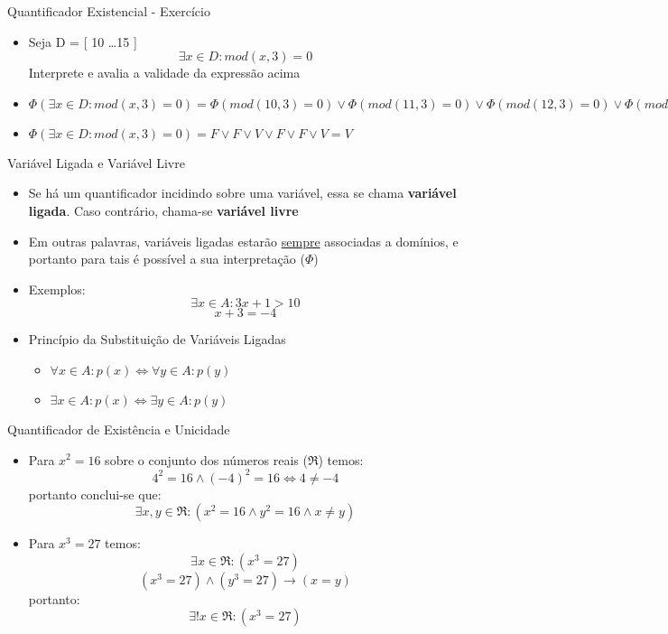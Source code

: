 \begin{frame}[t]{Quantificador Existencial - Exercício}
	\begin{itemize}\itemsep 0.7cm
	\item Seja D = [ 10 \ldots 15 ] $$\exists x \in D: mod(x,3) = 0$$ Interprete e avalia a validade da expressão acima

	\item {\scriptsize $\Phi(\exists x \in D: mod(x,3) = 0) = \Phi(mod(10,3) = 0) \vee \Phi(mod(11,3) = 0) \vee \Phi(mod(12,3) = 0) \vee \Phi(mod(13,3) = 0) \vee \Phi(mod(14,3) = 0) \vee \Phi(mod(15,3) = 0)$}

	\item $\Phi(\exists x \in D: mod(x,3) = 0) = F \vee F \vee V \vee F \vee F \vee V  =  V$
	\end{itemize}
\end{frame}

\begin{frame}[t]{Variável Ligada e Variável Livre}
	\begin{itemize}
	\item Se há um quantificador incidindo sobre uma variável, essa se chama {\bf variável ligada}. Caso contrário, chama-se {\bf variável livre}

	\item Em outras palavras, variáveis ligadas estarão \underline{sempre} associadas a domínios, e portanto para tais é possível a sua interpretação ($\Phi$)

	\item Exemplos: $$\exists x \in A: 3x + 1 > 10$$ $$x + 3 = -4$$

	\item Princípio da Substituição de Variáveis Ligadas
	\begin{itemize}
	\item $\forall x \in A: p(x) \Leftrightarrow \forall y \in A: p(y)$
	\item $\exists x \in A: p(x) \Leftrightarrow \exists y \in A: p(y)$
	\end{itemize}
	\end{itemize}
\end{frame}

\begin{frame}[t]{Quantificador de Existência e Unicidade}
	\begin{itemize}\itemsep 1cm
	\item Para $x^2 = 16$ sobre o conjunto dos números reais ($\Re$) temos: $$4^2 = 16 \wedge (-4)^2 = 16 \Leftrightarrow 4 \neq -4$$ portanto conclui-se que: $$\exists x,y \in \Re: (x^2 = 16 \wedge y^2 = 16 \wedge x \neq y)$$

	\item Para $x^3 = 27$ temos: $$\exists x \in\Re: (x^3 = 27)$$ $$(x^3 = 27) \wedge (y^3 = 27) \rightarrow (x = y)$$ portanto: $$\exists ! x \in\Re: (x^3 = 27)$$
	\end{itemize}
\end{frame}

